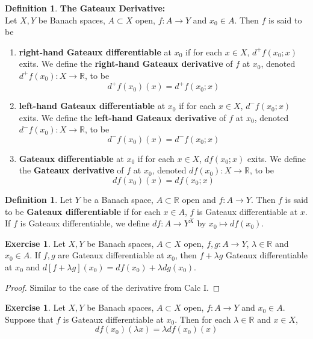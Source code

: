 \documentclass[12pt]{amsart}
\theoremstyle{definition}
\newtheorem{defn}[definition]{Definition}
\newtheorem{ex}[definition]{Exercise}
\newcommand{\lam}{\lambda}
\newcommand{\R}{\mathbb{R}}
\begin{document}
	\begin{defn}\textbf{The Gateaux Derivative:}\\
	Let $X,Y$ be Banach spaces, $A \subset X$ open, $f:A \rightarrow Y$ and $x_0 \in A$. Then $f$ is said to be 
	\begin{enumerate}
	\item \textbf{right-hand Gateaux differentiable} at $x_0$ if for each $x \in X$, $d^+ f(x_0; x)$ exits. We define the \textbf{right-hand Gateaux derivative} of $f$ at $x_0$, denoted $d^+ f(x_0) : X \rightarrow \R$, to be $$d^+ f(x_0)(x) = d^+ f(x_0;x)$$ 
	
	\item \textbf{left-hand Gateaux differentiable} at $x_0$ if for each $x \in X$, $d^- f(x_0; x)$ exits. We define the \textbf{left-hand Gateaux derivative} of $f$ at $x_0$, denoted $d^- f(x_0) : X \rightarrow \R$, to be $$d^- f(x_0)(x) = d^- f(x_0;x)$$
	
	\item \textbf{Gateaux differentiable} at $x_0$ if for each $x \in X$, $d f(x_0; x)$ exits. We define the \textbf{Gateaux derivative} of $f$ at $x_0$, denoted $d f(x_0) : X \rightarrow \R$, to be $$d f(x_0)(x) = d f(x_0;x)$$
	\end{enumerate}
	\end{defn}
	
	\begin{defn}
Let $Y$ be a Banach space, $A \subset \R$ open and $f:A \rightarrow Y$. Then $f$ is said to be \textbf{Gateaux differentiable} if for each $x \in A$, $f$ is Gateaux differentiable at $x$. If $f$ is Gateaux differentiable, we define $df:A \rightarrow Y^X$ by $x_0 \mapsto df(x_0)$.
\end{defn}	
	
	\begin{ex}
	Let $X, Y$ be Banach spaces, $A \subset X$ open, $f,g :A \rightarrow Y$, $\lam \in \R$ and $x_0 \in A$. If $f, g$ are Gateaux differentiable at $x_0$, then $f + \lam g$ Gateaux differentiable at $x_0$ and $d[f+\lam g](x_0) = df(x_0) + \lam dg(x_0)$.
	\end{ex}
	
	\begin{proof}
	Similar to the case of the derivative from Calc I. 
	\end{proof}		
	
	\begin{ex}
	Let $X, Y$ be Banach spaces, $A \subset X$ open, $f:A \rightarrow Y$ and $x_0 \in A$. Suppose that $f$ is Gateaux differentiable at $x_0$. Then for each $\lam \in \R$ and $x \in X$, $$df(x_0)(\lam x) = \lam df(x_0)(x)$$
	\end{ex}
	
\end{document}
